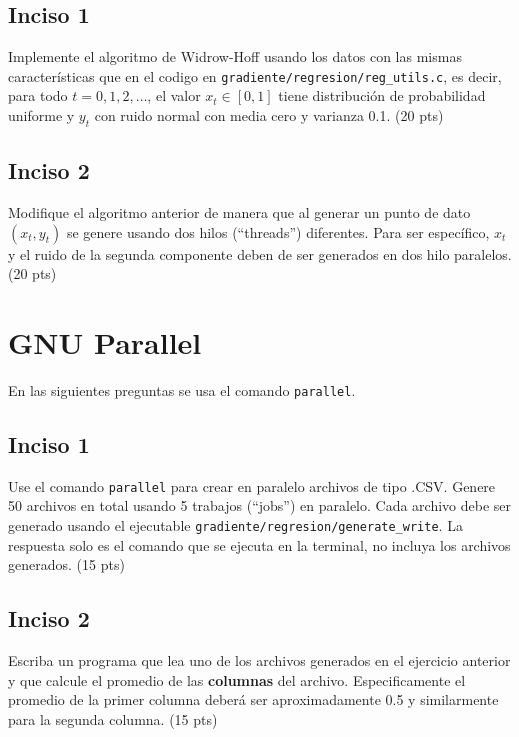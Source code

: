 \documentclass{article}
\begin{document}
\subsection{Inciso 1}
Implemente el algoritmo de Widrow-Hoff usando los datos con las mismas características que en el codigo en \texttt{gradiente/regresion/reg\_utils.c}, es decir, para todo $t = 0, 1, 2, \ldots$, el valor $x_t\in [0,1]$ tiene distribución de probabilidad uniforme y $y_t$ con ruido normal con media cero y varianza 0.1. (20 pts)

\subsection{Inciso 2}
Modifique el algoritmo anterior de manera que al generar un punto de dato $(x_t, y_t)$ se genere usando dos hilos (``threads'') diferentes. Para ser específico, $x_t$  y el ruido de la segunda componente deben de ser generados en dos hilo paralelos. (20 pts)

\section{GNU Parallel}
En las siguientes preguntas se usa el comando \texttt{parallel}.
\subsection{Inciso 1}
Use el comando \texttt{parallel} para crear  en paralelo archivos de tipo .CSV. Genere 50 archivos en total usando 5 trabajos (``jobs'') en paralelo. Cada archivo debe ser generado usando el ejecutable \texttt{gradiente/regresion/generate\_write}. La respuesta solo es el comando que se ejecuta en la terminal, no incluya los archivos generados. (15 pts)

\subsection{Inciso 2}
Escriba un programa que lea uno de los archivos generados en el ejercicio anterior y que calcule el promedio de las \textbf{columnas} del archivo. Especificamente el promedio de la primer columna deberá ser aproximadamente 0.5 y similarmente para la segunda columna. (15 pts)
\end{document}

